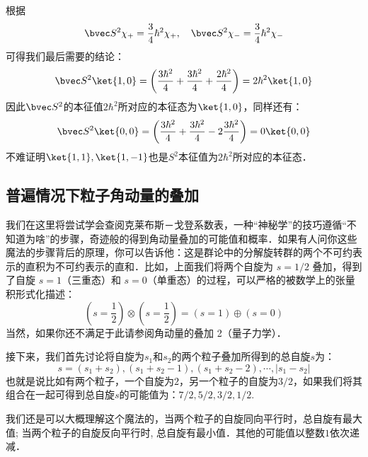 根据
\begin{equation}
\bvec S^2\chi_+=\frac{3}{4}\hbar^2\chi_+,\quad \bvec S^2\chi_-=\frac{3}{4}\hbar^2\chi_-
\end{equation}
可得我们最后需要的结论：
\begin{equation}
\bvec S^2\ket{1,0}=\left(\frac{3\hbar^2}{4}+\frac{3\hbar^2}{4}+\frac{2\hbar^2}{4}\right)=2\hbar^2\ket{1,0}
\end{equation}
因此$\bvec S^2$的本征值$2\hbar^2$所对应的本征态为$\ket{1,0}$，同样还有：
\begin{equation}
\bvec S^2\ket{0,0}=\left(\frac{3\hbar^2}{4}+\frac{3\hbar^2}{4}-2\frac{3\hbar^2}{4}\right)=0\ket{0,0}
\end{equation}
不难证明$\ket{1,1},\ket{1,-1}$也是$S^2$本征值为$2\hbar^2$所对应的本征态．
\subsection{普遍情况下粒子角动量的叠加}
我们在这里将尝试学会查阅克莱布斯－戈登系数表，一种“神秘学”的技巧遵循“不知道为啥”的步骤，奇迹般的得到角动量叠加的可能值和概率．如果有人问你这些魔法的步骤背后的原理，你可以告诉他：这是群论中的分解旋转群的两个不可约表示的直积为不可约表示的直和．比如，上面我们将两个自旋为 $s=1/2$ 叠加，得到了自旋 $s=1$（三重态）和 $s=0$（单重态）的过程，可以严格的被数学上的张量积形式化描述：
\begin{equation}
(s=\frac{1}{2})\otimes(s=\frac{1}{2})=(s=1)\oplus (s=0)
\end{equation}
当然，如果你还不满足于此请参阅角动量的叠加 2（量子力学）．

接下来，我们首先讨论将自旋为$s_1$和$s_2$的两个粒子叠加所得到的总自旋$s$为：
\begin{equation}
s=(s_1+s_2),(s_1+s_2-1),(s_1+s_2-2),\cdots,|s_1-s_2|
\end{equation}
也就是说比如有两个粒子，一个自旋为$2$，另一个粒子的自旋为$3/2$，如果我们将其组合在一起可得到总自旋$s$的可能值为：$7/2,5/2,3/2,1/2$.

我们还是可以大概理解这个魔法的，当两个粒子的自旋同向平行时，总自旋有最大值; 当两个粒子的自旋反向平行时, 总自旋有最小值．其他的可能值以整数$1$依次递减．

